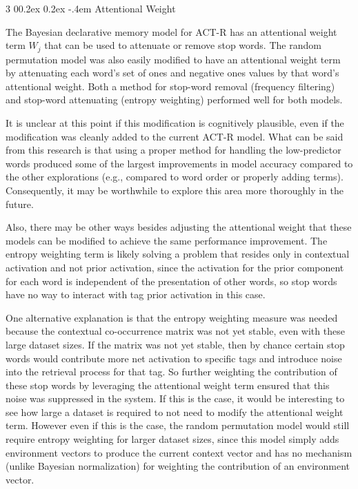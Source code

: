 \documentclass[man,floatsintext,donotrepeattitle]{apa6}
\makeatletter
\renewcommand{\subsubsection}{%
  \@startsection
  {subsubsection}%
  {3}%
  {\parindent}%
  {0\baselineskip \@plus 0.2ex \@minus 0.2ex}%
  {-.4em}%
  {\normalfont\normalsize\bfseries\addperi}}
\makeatother
\begin{document}
\subsubsection{Attentional Weight}

The Bayesian declarative memory model for ACT-R has an attentional weight term $W_{j}$ that can be used to attenuate or remove stop words.
The random permutation model was also easily modified to have an attentional weight term by attenuating each word's set of ones and negative ones values by that word's attentional weight.
Both a method for stop-word removal (frequency filtering) and stop-word attenuating (entropy weighting) performed well for both models.

It is unclear at this point if this modification is cognitively plausible, even if the modification was cleanly added to the current ACT-R model.
What can be said from this research is that using a proper method for handling the low-predictor words produced some of the largest improvements in model accuracy compared to the other explorations
(e.g., compared to word order or properly adding terms).
Consequently, it may be worthwhile to explore this area more thoroughly in the future.

Also, there may be other ways besides adjusting the attentional weight that these models can be modified to achieve the same performance improvement.
The entropy weighting term is likely solving a problem that resides only in contextual activation and not prior activation,
since the activation for the prior component for each word is independent of the presentation of other words, so stop words have no way to interact with tag prior activation in this case.

One alternative explanation is that the entropy weighting measure was needed because the contextual co-occurrence matrix was not yet stable, even with these large dataset sizes.
If the matrix was not yet stable, then by chance certain stop words would contribute more net activation to specific tags and introduce noise into the retrieval process for that tag.
So further weighting the contribution of these stop words by leveraging the attentional weight term ensured that this noise was suppressed in the system.
If this is the case, it would be interesting to see how large a dataset is required to not need to modify the attentional weight term.
However even if this is the case, the random permutation model would still require entropy weighting for larger dataset sizes,
since this model simply adds environment vectors to produce the current context vector and has no mechanism (unlike Bayesian normalization) for weighting the contribution of an environment vector.
\end{document}
